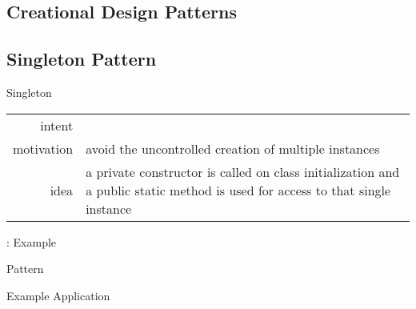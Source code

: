 \subsection{Creational Design Patterns}
\begin{frame}{\insertsubsection{} \mytitlesource{\gof}}
	\centering{}
\end{frame}

\subsection{Singleton Pattern}
\begin{frame}{\insertsubsection}
	\begin{fancycolumns}
		\begin{definition}{Singleton \mysource{\gofen}}
			\setlength\tabcolsep{1mm}
			\begin{tabularx}{\textwidth}{rX}				
				intent & \mycite{Ensure a class [has only] one instance, and provide a global point of access to it.}\\
				motivation & avoid the uncontrolled creation of multiple instances\\
				idea & a private constructor is called on class initialization and a public static method is used for access to that single instance
			\end{tabularx}
		\end{definition}
		\nextcolumn
		\centering{}
	\end{fancycolumns}
\end{frame}

\begin{frame}{\insertsubsection: Example}
	\begin{fancycolumns}
		\begin{definitiontight}{Pattern}
			\centering\singleton{width=.5\linewidth}		
		\end{definitiontight}
		\nextcolumn
		\begin{exampletight}{Example Application}
			\centering\singletonexample{width=.5\linewidth}
		\end{exampletight}
	\end{fancycolumns}
\end{frame}

